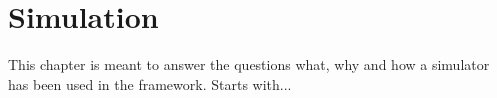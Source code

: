 
\chapter{Simulation} %
\label{cha:simulation}
This chapter is meant to answer the questions what, why and how a simulator has been used in the framework.
Starts with...








